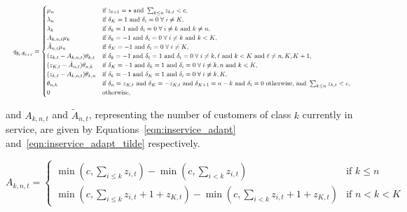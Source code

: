 \documentclass{article}
\begin{document}
\begin{equation}\label{eqn:transitions_sojourn}
\resizebox{\textwidth}{!}{%
$q_{\underline{\mathbf{z}}_t, \underline{\mathbf{z}}_{t+1}} = 
\begin{cases}
\mu_n & \text{if } z_{t+1} = \star \text{ and } \sum_{k \leq n} z_{k, t} < c, \\
\lambda_n & \text{if } \delta_K = 1 \text{ and } \delta_i = 0 \; \forall \; i \neq K, \\
\lambda_k & \text{if } \delta_k = 1 \text{ and } \delta_i = 0 \; \forall \; i \neq k \text{ and } k \neq n,\\
A_{k,n,t} \mu_k & \text{if } \delta_k = -1 \text{ and } \delta_i = 0 \; \forall \; i \neq k \text{ and } k < K,\\
\tilde{A}_{n,t} \mu_n & \text{if } \delta_K = -1 \text{ and } \delta_i = 0 \; \forall \; i \neq K,\\
(z_{k,t} - A_{k,n,t}) \theta_{k,\ell} & \text{if } \delta_{k} = -1 \text{ and } \delta_{\ell} = 1 \text{ and } \delta_i = 0 \; \forall \; i \neq k, \ell \text{ and } k < K \text{ and } \ell \neq n, K, K+1, \\
(z_{K,t} - \tilde{A}_{n,t}) \theta_{n,k} & \text{if } \delta_K = -1 \text{ and } \delta_{k} = 1 \text{ and } \delta_i = 0 \; \forall \; i \neq k, n \text{ and } k < K, \\
(z_{k,t} - A_{k,n,t}) \theta_{k,n} & \text{if } \delta_k = -1 \text{ and } \delta_K = 1 \text{ and } \delta_i = 0 \; \forall \; i \neq k, K, \\
\theta_{n, k} & \text{if } \delta_n = z_{K,t} \text{ and } \delta_K = -z_{K,t} \text{ and } \delta_{K+1} = n - k \text{ and } \delta_i = 0 \text{ otherwise, and } \sum_{k \leq n} z_{k, t} < c, \\
0 & \text{otherwise,}
\end{cases}$%
}
\end{equation}

and $A_{k,n,t}$ and $\tilde{A}_{n, t}$, representing the number of customers of
class $k$ currently in service, are given by Equations~\ref{eqn:inservice_adapt}
and~\ref{eqn:inservice_adapt_tilde} respectively.

\begin{equation}\label{eqn:inservice_adapt}
A_{k,n,t} =
\begin{cases}
\min\left(c, \sum_{i \leq k} z_{i,t}\right) - \min\left(c, \sum_{i < k} z_{i,t}\right) & \text{if } k \leq n \\
\min\left(c, \sum_{i \leq k} z_{i,t} + 1 + z_{K,t}\right) - \min\left(c, \sum_{i < k} z_{i,t} + 1 + z_{K,t}\right) & \text{if } n < k < K
\end{cases}
\end{equation}
\end{document}
